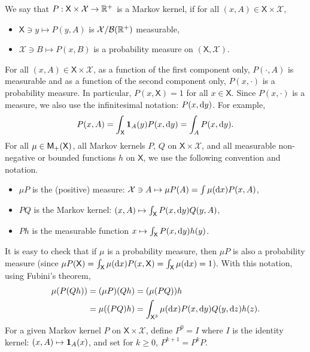 \documentclass[english,graybox,envcountchap,envcountsame,sectrefs,shortlabels]{svmono}
\theoremstyle{style}
\newcommand{\Yset}{\mathsf{Y}}
\newcommand{\Ysigma}{\mathcal{Y}}
\newcommand{\eqsp}{}
\newcommand{\Xset}{\mathsf{X}}
\newcommand{\Xsigma}{\mathcal{X}}
\begin{document}
\begin{definition}
We say that $P:\Xset\times\Xsigma\to\rset^{+}$
is a Markov kernel, if for all $(x,A)\in\Xset\times\Xsigma$,
\begin{itemize}
\item $\Xset\ni y\mapsto P(y,A)$ is $\Xsigma/\mcbb(\rset^{+})$ measurable,
\item $\Xsigma\ni B\mapsto P(x,B)$ is a probability measure on $(\Xset,\Xsigma)$.
\end{itemize}
\end{definition}
For all $(x,A)\in\Xset\times\Xsigma$, as a function
of the first component only, $P(\cdot,A)$ is measurable and as a
function of the second component only, $P(x,\cdot)$ is a probability
measure. In particular, $P(x,\Xset)=1$ for all $x\in\Xset$. Since
$P(x,\cdot)$ is a measure, we also use the infinitesimal notation:
$P(x,\mathrm{d} y)$. For example, 
$$
P(x,A)=\int_{\Xset}\indi A(y)P(x,\rmd y)=\int_{A}P(x,\rmd y)\eqsp.
$$
For all $\mu\in\meas +(\Xset)$, all Markov kernels $P$, $Q$ on
$\Xset\times\Xsigma$, and all measurable non-negative or bounded
functions $h$ on $\Xset$, we use the following convention and
notation.
\begin{itemize}
\item $\mu P$ is the (positive) measure: $\Xsigma\ni A\mapsto\mu P(A)=\int\mu(\rmd x)P(x,A)$,
\item $PQ$ is the Markov kernel: $(x,A)\mapsto\int_{\Xset}P(x,\rmd y)Q(y,A)$,
\item $Ph$ is the measurable function $x\mapsto\int_{\Xset}P(x,\rmd y)h(y)$.
\end{itemize}
It is easy to check that if $\mu$ is a probability measure, then
$\mu P$ is also a probability measure (since $\mu P(\Xset)=\int_{\Xset}\mu(\rmd x)P(x,\Xset)=\int_{\Xset}\mu(\rmd x)=1$).
With this notation, using Fubini's theorem,
\begin{align*}
\mu(P(Qh)) & =(\mu P)(Qh)=(\mu(PQ))h\\
 & =\mu((PQ)h)=\int_{\Xset^{3}}\mu(\rmd x)P(x,\rmd y)Q(y,\rmd z)h(z).
\end{align*}
For a given
Markov kernel $P$ on $\Xset\times\Xsigma$, define $P^{0}=I$ where
$I$ is the identity kernel: $(x,A)\mapsto\mathbf{1}_{A}(x)$, and set for
$k\geq0$, $P^{k+1}=P^{k}P$.
\end{document}

